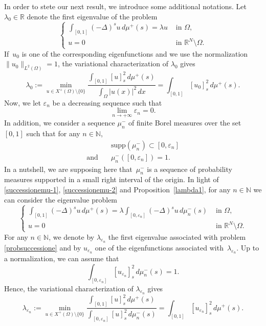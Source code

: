 \documentclass[12pt,a4paper,intlimits,sumlimits]{amsart}
\def \N {\mathbb{N}}
\def \R {\mathbb{R}}
\theoremstyle{definition}
\theoremstyle{plain}
\numberwithin{equation}{section}
\begin{document}
In order to stete our next result, we introduce some additional notations.
Let $\lambda_0\in\R$ denote the first eigenvalue of the problem
\begin{equation}\label{lambda0u0819e8ufjvo}
\begin{cases}
\displaystyle\int_{[0, 1]} (-\Delta)^s u\, d\mu^+(s) = \lambda u&  \mbox{ in } \Omega,\\
u=0 &  \mbox{ in } \R^N \setminus \Omega.
\end{cases}
\end{equation}
If~$u_0$ is one of the corresponding eigenfunctions and we use the normalization~ $\|u_0\|_{L^2(\Omega)}=1$, the variational characterization of $\lambda_0$ gives
\begin{equation}\label{lambda0u0}
\lambda_0:=\min_{u\in X^+(\Omega)\setminus\{0\}} \dfrac{\displaystyle\int_{[0, 1]} [u]^2_s \, d\mu^+(s)}{\displaystyle \int_\Omega |u(x)|^2\,dx}=\int_{[0, 1]} [u_0]^2_s \, d\mu^+(s).
\end{equation}
Now, we let $\varepsilon_n$ be a decreasing sequence such that 
\begin{equation}\label{epsnto0}
\lim_{n\to +\infty} \varepsilon_n =0.
\end{equation}
In addition, we consider a sequence $\mu^-_n$ of finite Borel measures over the set $[0, 1]$ such that for any $n\in\N$,
\begin{align}\label{successionemu-1}
& \mbox{supp}(\mu^-_n) \subset [0, \varepsilon_n]\\ \label{successionemu-2}
\mbox{and}\quad &\mu^-_n ([0, \varepsilon_n]) = 1.
\end{align}
In a nutshell, we are supposing here that~$\mu^-_n$ is a sequence of probability measures
supported in a small right interval of the origin.
In light of 
\eqref{successionemu-1}, \eqref{successionemu-2} and
Proposition~\ref{lambda1},  for any $n\in \N$ we can consider the eigenvalue problem
\begin{equation}\label{probsuccessione}
\begin{cases}
\displaystyle\int_{[0, 1]} (-\Delta)^s u\, d\mu^+(s) = \lambda \int_{[0, \varepsilon_n]} (-\Delta)^s u\, d\mu_n^-(s)  &  \mbox{ in } \Omega,
\\
u=0    &  \mbox{ in } \R^N \setminus \Omega.
\end{cases}
\end{equation}
For any $n\in\N$, we denote by $\lambda_{\varepsilon_n}$ the first eigenvalue associated with problem \eqref{probsuccessione} and by $u_{\varepsilon_n}$ one of the eigenfunctions associated with~$\lambda_{\varepsilon_n}$.
Up to a normalization, we can assume that 
\begin{equation}\label{lambdaen1}
\int_{[0, \varepsilon_n]}[u_{\varepsilon_n}]^2_s\,d\mu^-_n(s)=1.
\end{equation}
Hence, the variational characterization of $\lambda_{\varepsilon_n}$ gives
\begin{equation}\label{lambdaen2}
\lambda_{\varepsilon_n}:=\min_{u\in X^+(\Omega)\setminus\{0\}} \dfrac{\displaystyle\int_{[0, 1]} [u]^2_s \, d\mu^+(s)}{\displaystyle \int_{[0,\varepsilon_n] } [u]^2_s \, d\mu^-_n(s)}
=\int_{[0, 1]} [u_{\varepsilon_n}]^2_s \, d\mu^+(s).
\end{equation}
\end{document}
